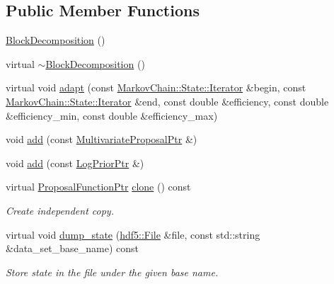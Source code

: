 \subsection*{Public Member Functions}
\begin{DoxyCompactItemize}
\item 
\hyperlink{classeos_1_1proposal__functions_1_1BlockDecomposition_a10f540b481d3278044e1b59821ee57f8}{BlockDecomposition} ()
\item 
virtual \hyperlink{classeos_1_1proposal__functions_1_1BlockDecomposition_aba384f3920606bc7ec8a0ca4f57f68f5}{$\sim$BlockDecomposition} ()
\item 
virtual void \hyperlink{classeos_1_1proposal__functions_1_1BlockDecomposition_a045b459bc8314548abe3e5766134e625}{adapt} (const \hyperlink{structeos_1_1MarkovChain_1_1State_ad7590843e4feca7e696c53863e6e10c1}{MarkovChain::State::Iterator} \&begin, const \hyperlink{structeos_1_1MarkovChain_1_1State_ad7590843e4feca7e696c53863e6e10c1}{MarkovChain::State::Iterator} \&end, const double \&efficiency, const double \&efficiency\_\-min, const double \&efficiency\_\-max)
\item 
void \hyperlink{classeos_1_1proposal__functions_1_1BlockDecomposition_aa162a93e808bd848cbf5e761eb83ca68}{add} (const \hyperlink{namespaceeos_1_1proposal__functions_a6cffa18d523cd6955629beabbe07c17c}{MultivariateProposalPtr} \&)
\item 
void \hyperlink{classeos_1_1proposal__functions_1_1BlockDecomposition_a0842f09231586dcf8fccd41e20f1198f}{add} (const \hyperlink{namespaceeos_ac5481e3b46ee55ff24606ee7f6e78651}{LogPriorPtr} \&)
\item 
virtual \hyperlink{namespaceeos_ae97f9891c67c90959a03fc96efaa4dc9}{ProposalFunctionPtr} \hyperlink{classeos_1_1proposal__functions_1_1BlockDecomposition_ac863a3b2df66507f62c8decc7f543653}{clone} () const 
\begin{DoxyCompactList}\small\item\em Create independent copy. \item\end{DoxyCompactList}\item 
virtual void \hyperlink{classeos_1_1proposal__functions_1_1BlockDecomposition_a6e35abd9d5995d4ce8cd931df9037034}{dump\_\-state} (\hyperlink{classeos_1_1hdf5_1_1File}{hdf5::File} \&file, const std::string \&data\_\-set\_\-base\_\-name) const 
\begin{DoxyCompactList}\small\item\em Store state in the file under the given base name. \item\end{DoxyCompactList}\item 

\end{DoxyCompactItemize}
